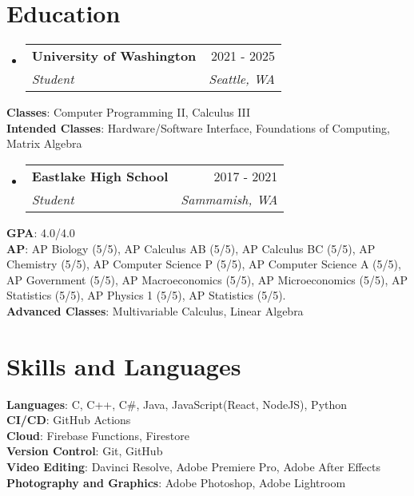 \documentclass[letterpaper,10pt]{article}
\makeatletter
\newcommand{\resumeSubheading}[4]{
  \vspace{-2pt}\item
    \begin{tabular*}{0.97\textwidth}[t]{l@{\extracolsep{\fill}}r}
      \textbf{#1} & #2 \\
      \textit{\small#3} & \textit{\small #4} \\
    \end{tabular*}\vspace{-7pt}
}
\newcommand{\resumeSubHeadingListStart}{\begin{itemize}[leftmargin=0.15in, label={}]}
\newcommand{\resumeSubHeadingListEnd}{\end{itemize}}
\makeatother
\begin{document}
\section{Education}
 \resumeSubHeadingListStart
    \resumeSubheading
      {University of Washington}{2021 - 2025}
      {Student}{Seattle, WA}
  \resumeSubHeadingListEnd

 \begin{itemize}[leftmargin=0.15in, label={}]
    \small{\item{
     \textbf{Classes}{: Computer Programming II, Calculus III} \\
     \textbf{Intended Classes}{: Hardware/Software Interface, Foundations of Computing, Matrix Algebra} 
    }}
 \end{itemize}
  \vspace{-10pt}
  \resumeSubHeadingListStart
    \resumeSubheading
      {Eastlake High School}{2017 - 2021}
      {Student}{Sammamish, WA}
  \resumeSubHeadingListEnd

 \begin{itemize}[leftmargin=0.15in, label={}]
    \small{\item{
     \textbf{GPA}{: 4.0/4.0} \\
     \textbf{AP}{: AP Biology (5/5), AP Calculus AB (5/5), AP Calculus BC (5/5), AP Chemistry (5/5), AP Computer Science P (5/5), AP Computer Science A (5/5), AP Government (5/5), AP Macroeconomics (5/5), AP Microeconomics (5/5), AP Statistics (5/5), AP Physics 1 (5/5), AP Statistics (5/5).} \\
     \textbf{Advanced Classes}{: Multivariable Calculus, Linear Algebra}
    }}
 \end{itemize}


\section{Skills and Languages} 
 \begin{itemize}[leftmargin=0.15in, label={}]
    \small{\item{
    \textbf{Languages}{: C, C++, C\#, Java, JavaScript(React, NodeJS), Python} \\
     \textbf{CI/CD}{: GitHub Actions} \\
     \textbf{Cloud}{: Firebase Functions, Firestore}\\
     \textbf{Version Control}{: Git, GitHub} \\
     \textbf{Video Editing}{: Davinci Resolve, Adobe Premiere Pro, Adobe After Effects} \\
     \textbf{Photography and Graphics}{: Adobe Photoshop, Adobe Lightroom} \\
    }}
 \end{itemize}
 \vspace{-20pt}
\end{document}
